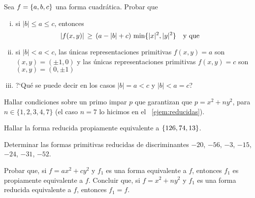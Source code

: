 \begin{ejerDefinidas}\label{ejer:definidas:cota}
	Sea $f=\left\{a,b,c\right\}$ una forma cuadr\'atica. Probar que
	\begin{enumerate}[(i)]
		\item\label{item:ejer:definidas:cota:i}
			si $|b|\leq a\leq c$, entonces
			\begin{displaymath}
				|f(x,y)|\,\geq\,
					(a-|b|+c)\, \min\{|x|^2,|y|^2\}
				\quad\text{y que}\quad
			\end{displaymath}
		\item\label{item:ejer:definidas:cota:ii}
			si $|b|<a<c$,
			las \'unicas representaciones primitivas
			$f(x,y)=a$ son $(x,y)=(\pm 1,0)$ y
			las \'unicas representaciones primitivas
			$f(x,y)=c$ son $(x,y)=(0,\pm 1)$
		\item\label{item:ejer:definidas:cota:iii}
			?`Qu\'e se puede decir en los casos $|b|=a<c$ y
			$|b|<a=c$?
	\end{enumerate}
\end{ejerDefinidas}

\begin{ejerDefinidas}
	Hallar condiciones sobre un primo impar $p$ que garantizan
	que $p=x^2+ny^2$, para $n\in\{1,2,3,4,7\}$ (el caso
	$n=7$ lo hicimos en el \ejemname~\ref{ejem:reducidas}).
\end{ejerDefinidas}

\begin{ejerDefinidas}
	Hallar la forma reducida propiamente equivalente a
	$\left\{126,74,13\right\}$.
\end{ejerDefinidas}

\begin{ejerDefinidas}\label{ejer:definidas:varios}
	Determinar las formas primitivas reducidas de discriminantes
	$-20$, $-56$, $-3$, $-15$, $-24$, $-31$, $-52$.
\end{ejerDefinidas}

\begin{ejerDefinidas}\label{ejer:definidas:representaciones}
	Probar que, si $f=ax^2+cy^2$ y $f_1$ es una forma
	equivalente a $f$, entonces $f_1$ es propiamente
	equivalente a $f$. Concluir que, si $f=x^2+ny^2$ y
	$f_1$ es una forma reducida equivalente a $f$, entonces
	$f_1=f$.
\end{ejerDefinidas}

